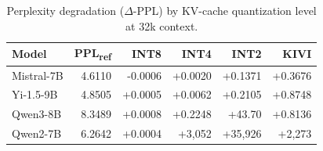 \begin{table}[htbp]
\centering
\caption{Perplexity degradation ($\Delta$-PPL) by KV-cache quantization level at 32k context.}
\label{tab:delta_ppl_cross_model}
\begin{tabular}{l r r r r r}
\toprule
Model & PPL\textsubscript{ref} & INT8 & INT4 & INT2 & KIVI \\
\midrule
Mistral-7B & 4.6110 & -0.0006 & +0.0020 & +0.1371 & +0.3676 \\
Yi-1.5-9B & 4.8505 & +0.0005 & +0.0062 & +0.2105 & +0.8748 \\
Qwen3-8B & 8.3489 & +0.0008 & +0.2248 & +43.70 & +0.8136 \\
Qwen2-7B & 6.2642 & +0.0004 & +3,052 & +35,926 & +2,273 \\
\bottomrule
\end{tabular}
\end{table}